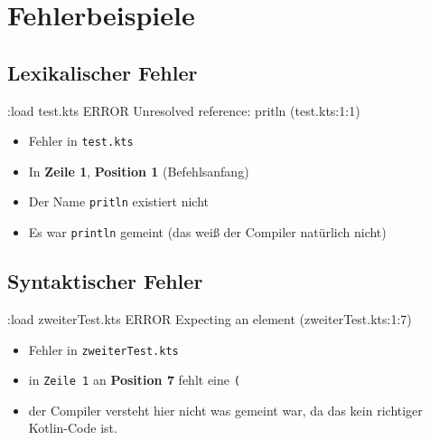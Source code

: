 \section{Fehlerbeispiele}
\subsection{Lexikalischer Fehler}
\begin{frame}[fragile]
    \slidehead
    \pause
    \begin{commandshell}[][minted language=text]
        [0] :load test.kts
        ERROR Unresolved reference: pritln (test.kts:1:1)
    \end{commandshell}
    \pause
    \begin{itemize}[<+->]
        \item Fehler in \texttt{test.kts}
        \item In \textbf{Zeile 1}, \textbf{Position 1} (Befehlsanfang)
        \item Der Name \texttt{pritln} existiert nicht
        \item Es war \texttt{println} gemeint (das weiß der Compiler natürlich nicht)
    \end{itemize}
\end{frame}

\subsection{Syntaktischer Fehler}

\begin{frame}[fragile]
    \slidehead
    \pause
    \begin{commandshell}[][minted language=text]
        [0] :load zweiterTest.kts
        ERROR Expecting an element (zweiterTest.kts:1:7)
    \end{commandshell}
    \pause
    \begin{itemize}[<+->]
        \item Fehler in \texttt{zweiterTest.kts}
        \item in \texttt{Zeile 1} an \textbf{Position 7} fehlt eine \texttt{(}
        \item der Compiler versteht hier nicht was gemeint war, da das kein richtiger Kotlin-Code ist.
    \end{itemize}
\end{frame}

